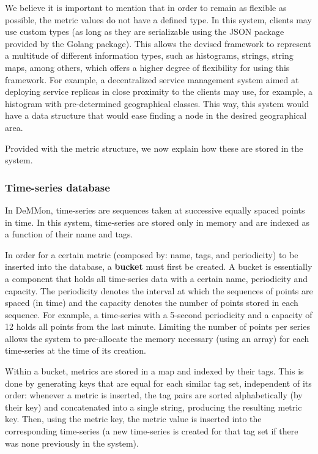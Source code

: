 We believe it is important to mention that in order to remain as flexible as possible, the metric values do not have a defined type. In this system, clients may use custom types (as long as they are serializable using the JSON package provided by the Golang \cite{golang} package). This allows the devised framework to represent a multitude of different information types, such as histograms, strings, string maps, among others, which offers a higher degree of flexibility for using this framework. For example, a decentralized service management system aimed at deploying service replicas in close proximity to the clients may use, for example, a histogram with pre-determined geographical classes. This way, this system would have a data structure that would ease finding a node in the desired geographical area.

Provided with the metric structure, we now explain how these are stored in the system. 

\subsubsection{Time-series database}  \label{sec:mon_module:tsdb}

In DeMMon, time-series are sequences taken at successive equally spaced points in time. In this system, time-series are stored only in memory and are indexed as a function of their name and tags.

In order for a certain metric (composed by: name, tags, and periodicity) to be inserted into the database, a \textbf{bucket} must first be created. A bucket is essentially a component that holds all time-series data with a certain name, periodicity and capacity. The periodicity denotes the interval at which the sequences of points are spaced (in time) and the capacity denotes the number of points stored in each sequence. For example, a time-series with a 5-second periodicity and a capacity of 12 holds all points from the last minute. Limiting the number of points per series allows the system to pre-allocate the memory necessary (using an array) for each time-series at the time of its creation.

Within a bucket, metrics are stored in a map and indexed by their tags. This is done by generating keys that are equal for each similar tag set, independent of its order: whenever a metric is inserted, the tag pairs are sorted alphabetically (by their key) and concatenated into a single string, producing the resulting metric key. Then, using the metric key, the metric value is inserted into the corresponding time-series (a new time-series is created for that tag set if there was none previously in the system).


